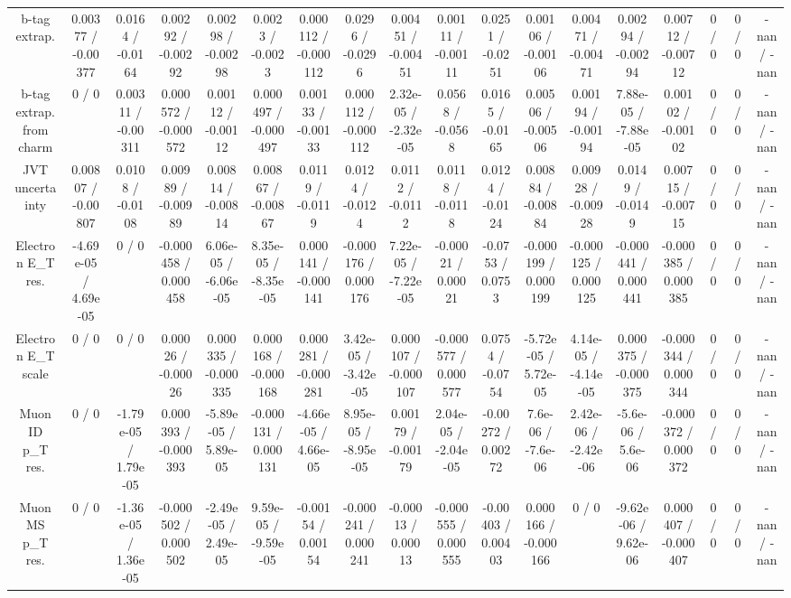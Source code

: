 \documentclass[10pt]{article}
\begin{document}
\begin{table}[htbp]
\begin{center}
\begin{tabular}{|c|c|c|c|c|c|c|c|c|c|c|c|c|c|c|c|c|c|}
  b-tag extrap. & 0.00377 / -0.00377 & 0.0164 / -0.0164 & 0.00292 / -0.00292 & 0.00298 / -0.00298 & 0.0023 / -0.0023 & 0.000112 / -0.000112 & 0.0296 / -0.0296 & 0.00451 / -0.00451 & 0.00111 / -0.00111 & 0.0251 / -0.0251 & 0.00106 / -0.00106 & 0.00471 / -0.00471 & 0.00294 / -0.00294 & 0.00712 / -0.00712 & 0 / 0 & 0 / 0 & -nan / -nan \\ 
  b-tag extrap. from charm & 0 / 0 & 0.00311 / -0.00311 & 0.000572 / -0.000572 & 0.00112 / -0.00112 & 0.000497 / -0.000497 & 0.00133 / -0.00133 & 0.000112 / -0.000112 & 2.32e-05 / -2.32e-05 & 0.0568 / -0.0568 & 0.0165 / -0.0165 & 0.00506 / -0.00506 & 0.00194 / -0.00194 & 7.88e-05 / -7.88e-05 & 0.00102 / -0.00102 & 0 / 0 & 0 / 0 & -nan / -nan \\ 
  JVT uncertainty & 0.00807 / -0.00807 & 0.0108 / -0.0108 & 0.00989 / -0.00989 & 0.00814 / -0.00814 & 0.00867 / -0.00867 & 0.0119 / -0.0119 & 0.0124 / -0.0124 & 0.0112 / -0.0112 & 0.0118 / -0.0118 & 0.0124 / -0.0124 & 0.00884 / -0.00884 & 0.00928 / -0.00928 & 0.0149 / -0.0149 & 0.00715 / -0.00715 & 0 / 0 & 0 / 0 & -nan / -nan \\ 
  Electron E_{T} res. & -4.69e-05 / 4.69e-05 & 0 / 0 & -0.000458 / 0.000458 & 6.06e-05 / -6.06e-05 & 8.35e-05 / -8.35e-05 & 0.000141 / -0.000141 & -0.000176 / 0.000176 & 7.22e-05 / -7.22e-05 & -0.00021 / 0.00021 & -0.0753 / 0.0753 & -0.000199 / 0.000199 & -0.000125 / 0.000125 & -0.000441 / 0.000441 & -0.000385 / 0.000385 & 0 / 0 & 0 / 0 & -nan / -nan \\ 
  Electron E_{T} scale & 0 / 0 & 0 / 0 & 0.00026 / -0.00026 & 0.000335 / -0.000335 & 0.000168 / -0.000168 & 0.000281 / -0.000281 & 3.42e-05 / -3.42e-05 & 0.000107 / -0.000107 & -0.000577 / 0.000577 & 0.0754 / -0.0754 & -5.72e-05 / 5.72e-05 & 4.14e-05 / -4.14e-05 & 0.000375 / -0.000375 & -0.000344 / 0.000344 & 0 / 0 & 0 / 0 & -nan / -nan \\ 
  Muon ID p_{T} res. & 0 / 0 & -1.79e-05 / 1.79e-05 & 0.000393 / -0.000393 & -5.89e-05 / 5.89e-05 & -0.000131 / 0.000131 & -4.66e-05 / 4.66e-05 & 8.95e-05 / -8.95e-05 & 0.00179 / -0.00179 & 2.04e-05 / -2.04e-05 & -0.00272 / 0.00272 & 7.6e-06 / -7.6e-06 & 2.42e-06 / -2.42e-06 & -5.6e-06 / 5.6e-06 & -0.000372 / 0.000372 & 0 / 0 & 0 / 0 & -nan / -nan \\ 
  Muon MS p_{T} res. & 0 / 0 & -1.36e-05 / 1.36e-05 & -0.000502 / 0.000502 & -2.49e-05 / 2.49e-05 & 9.59e-05 / -9.59e-05 & -0.00154 / 0.00154 & -0.000241 / 0.000241 & -0.00013 / 0.00013 & -0.000555 / 0.000555 & -0.00403 / 0.00403 & 0.000166 / -0.000166 & 0 / 0 & -9.62e-06 / 9.62e-06 & 0.000407 / -0.000407 & 0 / 0 & 0 / 0 & -nan / -nan \\ 

\end{tabular}
\end{center}
\end{table}
\end{document}
